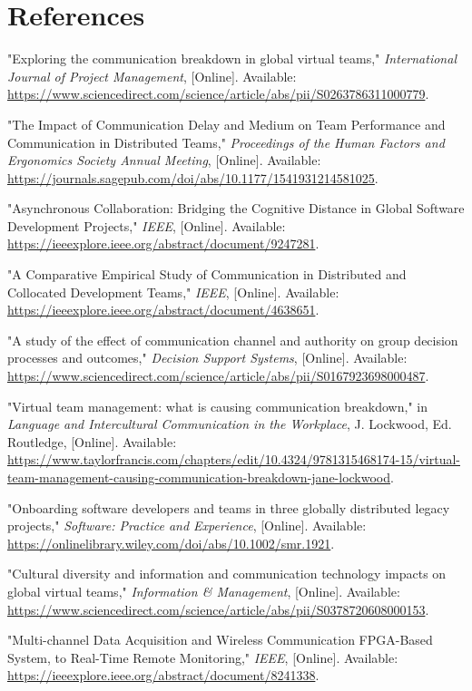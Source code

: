 \documentclass[12pt]{article}
\begin{document}
\section*{References}
\vspace*{-35pt}
\renewcommand{\refname}{}

\begin{thebibliography}{9}
"Exploring the communication breakdown in global virtual teams," \emph{International Journal of Project Management}, [Online]. Available: \url{https://www.sciencedirect.com/science/article/abs/pii/S0263786311000779}.

"The Impact of Communication Delay and Medium on Team Performance and Communication in Distributed Teams," \emph{Proceedings of the Human Factors and Ergonomics Society Annual Meeting}, [Online]. Available: \url{https://journals.sagepub.com/doi/abs/10.1177/1541931214581025}.

"Asynchronous Collaboration: Bridging the Cognitive Distance in Global Software Development Projects," \emph{IEEE}, [Online]. Available: \url{https://ieeexplore.ieee.org/abstract/document/9247281}.

"A Comparative Empirical Study of Communication in Distributed and Collocated Development Teams," \emph{IEEE}, [Online]. Available: \url{https://ieeexplore.ieee.org/abstract/document/4638651}.

"A study of the effect of communication channel and authority on group decision processes and outcomes," \emph{Decision Support Systems}, [Online]. Available: \url{https://www.sciencedirect.com/science/article/abs/pii/S0167923698000487}.

"Virtual team management: what is causing communication breakdown," in \emph{Language and Intercultural Communication in the Workplace}, J. Lockwood, Ed. Routledge, [Online]. Available: \url{https://www.taylorfrancis.com/chapters/edit/10.4324/9781315468174-15/virtual-team-management-causing-communication-breakdown-jane-lockwood}.

"Onboarding software developers and teams in three globally distributed legacy projects," \emph{Software: Practice and Experience}, [Online]. Available: \url{https://onlinelibrary.wiley.com/doi/abs/10.1002/smr.1921}.

"Cultural diversity and information and communication technology impacts on global virtual teams," \emph{Information \& Management}, [Online]. Available: \url{https://www.sciencedirect.com/science/article/abs/pii/S0378720608000153}.

"Multi-channel Data Acquisition and Wireless Communication FPGA-Based System, to Real-Time Remote Monitoring," \emph{IEEE}, [Online]. Available: \url{https://ieeexplore.ieee.org/abstract/document/8241338}.
\end{thebibliography}
\end{document}
